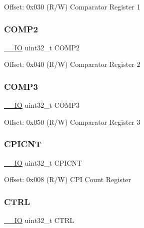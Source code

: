 Offset\+: 0x030 (R/W) Comparator Register 1 \mbox{\label{struct_d_w_t___type_a5f159cd97def70baad2faa8d250bb86a}} 
\subsubsection{\texorpdfstring{C\+O\+M\+P2}{COMP2}}
{\footnotesize\ttfamily \mbox{\hyperlink{core__cm3_8h_aec43007d9998a0a0e01faede4133d6be}{\+\_\+\+\_\+\+IO}} uint32\+\_\+t C\+O\+M\+P2}

Offset\+: 0x040 (R/W) Comparator Register 2 \mbox{\label{struct_d_w_t___type_a923d50abd92dbc50ef2983770489eafd}} 
\subsubsection{\texorpdfstring{C\+O\+M\+P3}{COMP3}}
{\footnotesize\ttfamily \mbox{\hyperlink{core__cm3_8h_aec43007d9998a0a0e01faede4133d6be}{\+\_\+\+\_\+\+IO}} uint32\+\_\+t C\+O\+M\+P3}

Offset\+: 0x050 (R/W) Comparator Register 3 \mbox{\label{struct_d_w_t___type_a49a1dced8d644fa6f4128570f102212e}} 
\subsubsection{\texorpdfstring{C\+P\+I\+C\+NT}{CPICNT}}
{\footnotesize\ttfamily \mbox{\hyperlink{core__cm3_8h_aec43007d9998a0a0e01faede4133d6be}{\+\_\+\+\_\+\+IO}} uint32\+\_\+t C\+P\+I\+C\+NT}

Offset\+: 0x008 (R/W) C\+PI Count Register \mbox{\label{struct_d_w_t___type_a15fc8d35f045f329b80c544bef35ff64}} 
\subsubsection{\texorpdfstring{C\+T\+RL}{CTRL}}
{\footnotesize\ttfamily \mbox{\hyperlink{core__cm3_8h_aec43007d9998a0a0e01faede4133d6be}{\+\_\+\+\_\+\+IO}} uint32\+\_\+t C\+T\+RL}

